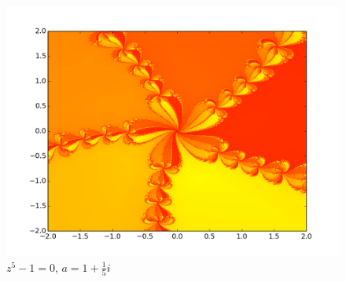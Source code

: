 \documentclass[12pt]{article}
\begin{document}
\begin{figure}[H]
    \centerline{
        \includegraphics[scale=0.63]{fractal_100_1500_5.png}
    }
    \caption*{$z^5 - 1 = 0$, $a = 1 + \frac{1}{5}i$}
\end{figure}

%
%
%
%
%
%
\end{document}
